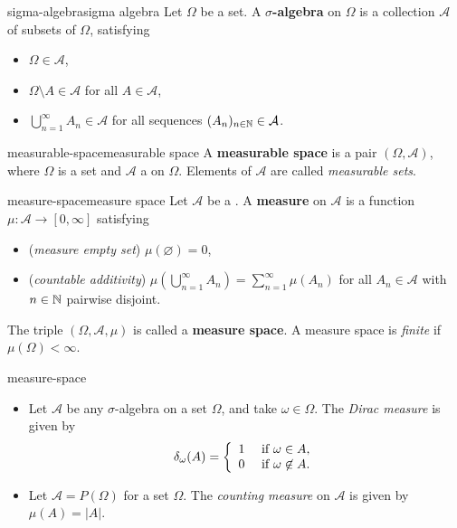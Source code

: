 \begin{topic}{sigma-algebra}{sigma algebra}
    Let $\Omega$ be a set. A \textbf{$\sigma$-algebra} on $\Omega$ is a collection $\mathcal{A}$ of subsets of $\Omega$, satisfying
    \begin{itemize}
        \item $\Omega \in \mathcal{A}$,
        \item $\Omega \setminus A \in \mathcal{A}$ for all $A \in \mathcal{A}$,
        \item $\bigcup_{n = 1}^\infty A_n \in \mathcal{A}$ for all sequences $(A_n)_{n \in \mathbb{N}} \in \mathcal{A}$.
    \end{itemize}
\end{topic}

\begin{topic}{measurable-space}{measurable space}
    A \textbf{measurable space} is a pair $(\Omega, \mathcal{A})$, where $\Omega$ is a set and $\mathcal{A}$ a  on $\Omega$. Elements of $\mathcal{A}$ are called \textit{measurable sets}.
\end{topic}

\begin{topic}{measure-space}{measure space}
    Let $\mathcal{A}$ be a . A \textbf{measure} on $\mathcal{A}$ is a function $\mu \colon \mathcal{A} \to [0, \infty]$ satisfying
    \begin{itemize}
        \item (\textit{measure empty set}) $\mu(\varnothing) = 0$,
        \item (\textit{countable additivity}) $\mu(\bigcup_{n = 1}^\infty A_n) = \sum_{n = 1}^\infty \mu(A_n)$ for all $A_n \in \mathcal{A}$ with $n \in \mathbb{N}$ pairwise disjoint.
    \end{itemize}
    The triple $(\Omega, \mathcal{A}, \mu)$ is called a \textbf{measure space}. A measure space is \textit{finite} if $\mu(\Omega) < \infty$.
\end{topic}

\begin{example}{measure-space}
    \begin{itemize}
        \item Let $\mathcal{A}$ be any $\sigma$-algebra on a set $\Omega$, and take $\omega \in \Omega$. The \textit{Dirac measure} is given by
        \[ \delta_\omega(A) = \left\{ \begin{array}{cl} 1 & \textup{ if } \omega \in A, \\ 0 & \textup{ if } \omega \not\in A . \end{array} \right. \]
        \item Let $\mathcal{A} = P(\Omega)$ for a set $\Omega$. The \textit{counting measure} on $\mathcal{A}$ is given by $\mu(A) = |A|$.
    \end{itemize}
\end{example}

